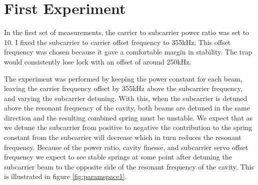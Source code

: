%

\section{First Experiment}


In the first set of measurements, the carrier to subcarrier power ratio was
set to 10.
I fixed the subcarrier to carrier offset frequency to 355kHz.
This offset frequency was chosen because it gave a comfortable margin
in stability.
The trap would consistently lose lock with an offset of around
250kHz.

The experiment was performed by keeping the power constant for each beam,
leaving the carrier frequency offset by 355kHz above the subcarrier frequency,
and varying the subcarrier detuning.
With this, when the subcarrier is detuned above the resonant frequency of the
cavity, both beams are detuned in the same direction and the resulting
combined spring must be unstable.
We expect that as we detune the subcarrier from positive to negative the
contribution to the spring constant from the subcarrier will decrease which
in turn reduces the resonant frequency.
Because of the power ratio, cavity finesse, and subcarrier servo offset
frequency we expect to see stable springs at some point after detuning the
subcarrier beam to the opposite side of the resonant frequency of the cavity.
This is illustrated in figure \ref{fig:paramspace1}.

